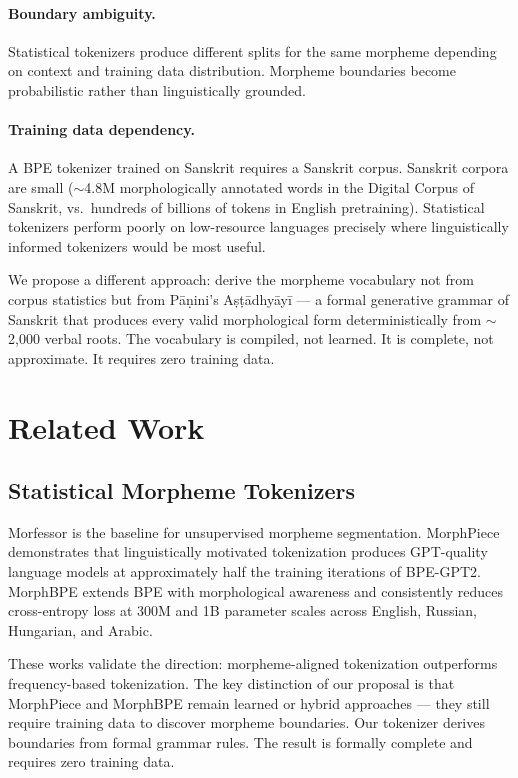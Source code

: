 \documentclass[11pt]{article}
\begin{document}
\paragraph{Boundary ambiguity.} Statistical tokenizers produce different splits for the same morpheme depending on context and training data distribution. Morpheme boundaries become probabilistic rather than linguistically grounded.

\paragraph{Training data dependency.} A BPE tokenizer trained on Sanskrit requires a Sanskrit corpus. Sanskrit corpora are small ($\sim$4.8M morphologically annotated words in the Digital Corpus of Sanskrit, vs.\ hundreds of billions of tokens in English pretraining). Statistical tokenizers perform poorly on low-resource languages precisely where linguistically informed tokenizers would be most useful.

We propose a different approach: derive the morpheme vocabulary not from corpus statistics but from P\={a}\d{n}ini's A\d{s}\d{t}\={a}dhy\={a}y\={i} --- a formal generative grammar of Sanskrit that produces every valid morphological form deterministically from $\sim$2,000 verbal roots. The vocabulary is compiled, not learned. It is complete, not approximate. It requires zero training data.

\section{Related Work}

\subsection{Statistical Morpheme Tokenizers}

Morfessor \citep{virpioja2013} is the baseline for unsupervised morpheme segmentation. MorphPiece \citep{jabbar2023} demonstrates that linguistically motivated tokenization produces GPT-quality language models at approximately half the training iterations of BPE-GPT2. MorphBPE \citep{asgari2025} extends BPE with morphological awareness and consistently reduces cross-entropy loss at 300M and 1B parameter scales across English, Russian, Hungarian, and Arabic.

These works validate the direction: morpheme-aligned tokenization outperforms frequency-based tokenization. The key distinction of our proposal is that MorphPiece and MorphBPE remain learned or hybrid approaches --- they still require training data to discover morpheme boundaries. Our tokenizer derives boundaries from formal grammar rules. The result is formally complete and requires zero training data.
\end{document}
